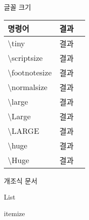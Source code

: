 \documentclass[10pt,xcolor=pdftex,dvipsnames,table,handout]{beamer}
\begin{document}
		\begin{frame}[t,allowframebreaks]{글꼴 크기}

			\begin{table}
			\begin{tabular}{ l l l  }
				명령어		&결과\\
				\hline
				\textbackslash tiny			&\tiny{결과}\\
				\textbackslash scriptsize		&\scriptsize{결과}\\
				\textbackslash footnotesize		&\footnotesize{결과}\\
				\textbackslash normalsize		&\normalsize{결과}\\
				\textbackslash large			&\large{결과}\\
				\textbackslash Large			&\Large{결과}\\
				\textbackslash LARGE			&\LARGE{결과}\\
				\textbackslash huge			&\huge{결과}\\
				\textbackslash Huge			&\Huge{결과}\\
			\end{tabular}
			\end{table}

		\end{frame}









		\begin{frame}[plain]
		\end{frame}

		\begin{frame}[plain]
		\Huge{개조식 문서}
		\end{frame}


		\begin{frame}[t]{List}

		\end{frame}


		\begin{frame}[t]{itemize}

		\end{frame}
\end{document}
